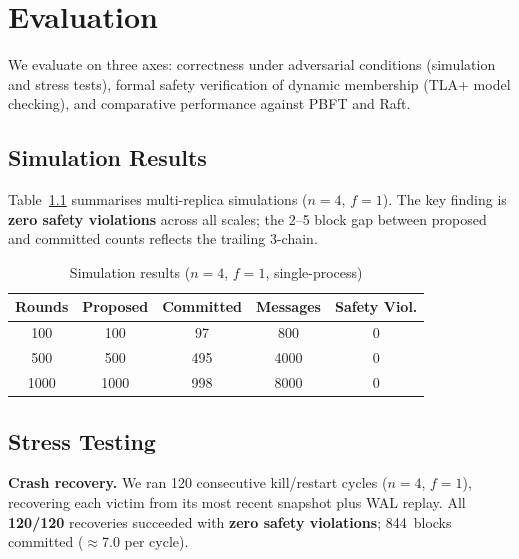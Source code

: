 \chapter{Evaluation}
\label{sec:evaluation}

We evaluate \persisthotstuff{} on three axes: correctness under adversarial conditions
(simulation and stress tests), formal safety verification of dynamic membership (TLA+ model
checking), and comparative performance against PBFT and Raft.

\section{Simulation Results}

Table~\ref{tab:simulation_results} summarises multi-replica simulations
($n{=}4$, $f{=}1$).  The key finding is \textbf{zero safety violations} across all scales;
the 2--5 block gap between proposed and committed counts reflects the trailing 3-chain.

\begin{table}[t]
\caption{Simulation results ($n{=}4$, $f{=}1$, single-process)}
\centering
\begin{tabular}{ccccc}
\toprule
\textbf{Rounds} & \textbf{Proposed} & \textbf{Committed}
  & \textbf{Messages} & \textbf{Safety Viol.} \\
\midrule
100  & 100  & 97  & 800  & 0 \\
500  & 500  & 495 & 4000 & 0 \\
1000 & 1000 & 998 & 8000 & 0 \\
\bottomrule
\end{tabular}
\label{tab:simulation_results}
\end{table}

\section{Stress Testing}

\noindent\textbf{Crash recovery.}\quad
We ran 120 consecutive kill/restart cycles ($n{=}4$, $f{=}1$), recovering each victim from
its most recent snapshot plus WAL replay.  All \textbf{120/120} recoveries succeeded with
\textbf{zero safety violations}; 844~blocks committed ($\approx$7.0 per cycle).


